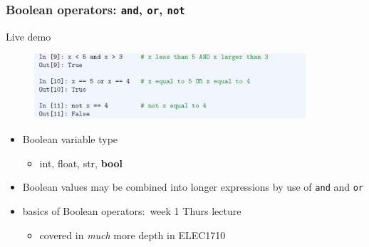 \documentclass[english,14pt]{beamer}
\newcommand\red[1]{{\color{red} #1}}
\begin{document}

\begin{frame}[fragile]

\frametitle{Boolean operators: \texttt{and}, \texttt{or}, \texttt{not}}

Live demo 

\begin{figure}[ht]
	\centering
	\includegraphics[width=0.9\textwidth]{figures/LLp47a}
\end{figure}

\begin{itemize}
	\item Boolean variable type
	\begin{itemize}
		\item int, float, str, \textbf{\red{bool}}
	\end{itemize}

	\item Boolean values may be combined into longer expressions by use of \texttt{and} and \texttt{or}
	\item basics of Boolean operators:~week 1 Thurs lecture
	\begin{itemize}
		\item covered in \emph{much} more depth in ELEC1710
	\end{itemize}
\end{itemize}

\end{frame}

%
%
%
%

\end{document}
